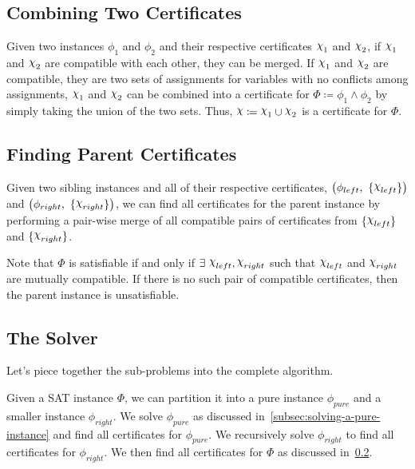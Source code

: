 \subsection{Combining Two Certificates}
\label{subsec:combining-two-certificates}

Given two instances $\phi_1$ and $\phi_2$ and their respective certificates $\rchi_1$ and $\rchi_2$, if $\rchi_1$ and $\rchi_2$ are compatible with each other, they can be merged.
If $\rchi_1$ and $\rchi_2$ are compatible, they are two sets of assignments for variables with no conflicts among assignments, $\rchi_1$ and $\rchi_2$ can be combined into a certificate for $\Phi \coloneqq \phi_1 \land \phi_2$ by simply taking the union of the two sets.
Thus, $\rchi \coloneqq \rchi_1 \cup \rchi_2$ is a certificate for $\Phi$.


\subsection{Finding Parent Certificates}
\label{subsec:finding-parent-certificates}

Given two sibling instances and all of their respective certificates, $\big(\phi_{left},~ \{ \rchi_{left} \}\big)$ and $\big(\phi_{right},~ \{ \rchi_{right} \}\big)$, we can find all certificates for the parent instance by performing a pair-wise merge of all compatible pairs of certificates from $\{ \rchi_{left} \}$ and $\{ \rchi_{right} \}$.

Note that $\Phi$ is satisfiable if and only if $\exists~ \rchi_{left}, \rchi_{right}$ such that $\rchi_{left}$ and $\rchi_{right}$ are mutually compatible.
If there is no such pair of compatible certificates, then the parent instance is unsatisfiable.

\subsection{The Solver}
\label{subsec:the-solver}

Let's piece together the sub-problems into the complete algorithm.

Given a SAT instance $\Phi$, we can partition it into a pure instance $\phi_{pure}$ and a smaller instance $\phi_{right}$.
We solve $\phi_{pure}$ as discussed in~\ref{subsec:solving-a-pure-instance} and find all certificates for $\phi_{pure}$.
We recursively solve $\phi_{right}$ to find all certificates for $\phi_{right}$.
We then find all certificates for $\Phi$ as discussed in~\ref{subsec:finding-parent-certificates}.
